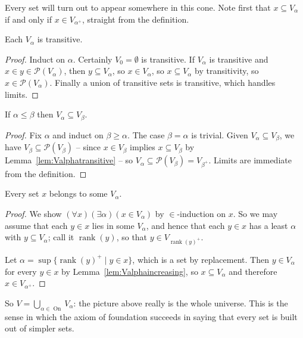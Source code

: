 \documentclass[a4paper]{scrartcl}
\newcommand{\on}{\operatorname{On}}
\newcommand{\rank}{\operatorname{rank}}
\begin{document}
Every set will turn out to appear somewhere in this cone. Note first that $x \subseteq V_\alpha$ if and only if $x \in V_{\alpha^+}$, straight from the definition.

\begin{lemma}\label{lem:Valphatransitive}
  Each $V_\alpha$ is transitive.
\end{lemma}
\begin{proof}
  Induct on $\alpha$. Certainly $V_0 = \emptyset$ is transitive. If $V_\alpha$ is transitive and $x \in y \in \mathcal{P}(V_\alpha)$, then $y \subseteq V_\alpha$, so $x \in V_\alpha$, so $x \subseteq V_\alpha$ by transitivity, so $x \in \mathcal{P}(V_\alpha)$. Finally a union of transitive sets is transitive, which handles limits.
\end{proof}

\begin{lemma}\label{lem:Valphaincreasing}
  If $\alpha \leq \beta$ then $V_\alpha \subseteq V_\beta$.
\end{lemma}
\begin{proof}
  Fix $\alpha$ and induct on $\beta \geq \alpha$. The case $\beta = \alpha$ is trivial. Given $V_\alpha \subseteq V_\beta$, we have $V_\beta \subseteq \mathcal{P}(V_\beta)$ -- since $x \in V_\beta$ implies $x \subseteq V_\beta$ by Lemma~\ref{lem:Valphatransitive} -- so $V_\alpha \subseteq \mathcal{P}(V_\beta) = V_{\beta^+}$. Limits are immediate from the definition.
\end{proof}

\begin{theorem}\label{thm:everysetinV}
  Every set $x$ belongs to some $V_\alpha$.
\end{theorem}
\begin{proof}
  We show $(\forall x)(\exists \alpha)(x \in V_\alpha)$ by $\in$-induction on $x$. So we may assume that each $y \in x$ lies in some $V_\alpha$, and hence that each $y \in x$ has a least $\alpha$ with $y \subseteq V_\alpha$; call it $\rank(y)$, so that $y \in V_{\rank(y)^+}$.

  Let $\alpha = \sup\{\rank(y)^+ \mid y \in x\}$, which is a set by replacement. Then $y \in V_\alpha$ for every $y \in x$ by Lemma~\ref{lem:Valphaincreasing}, so $x \subseteq V_\alpha$ and therefore $x \in V_{\alpha^+}$.
\end{proof}

So $V = \bigcup_{\alpha \in \on} V_\alpha$: the picture above really is the whole universe. This is the sense in which the axiom of foundation succeeds in saying that every set is built out of simpler sets.
\end{document}

